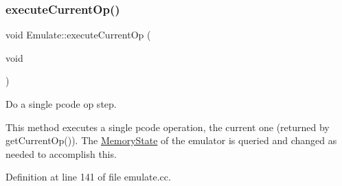 \subsubsection{\texorpdfstring{executeCurrentOp()}{executeCurrentOp()}}
{\footnotesize\ttfamily void Emulate\+::execute\+Current\+Op (\begin{DoxyParamCaption}\item[{void}]{ }\end{DoxyParamCaption})}



Do a single pcode op step. 

This method executes a single pcode operation, the current one (returned by get\+Current\+Op()). The \mbox{\hyperlink{class_memory_state}{Memory\+State}} of the emulator is queried and changed as needed to accomplish this. 

Definition at line 141 of file emulate.\+cc.

